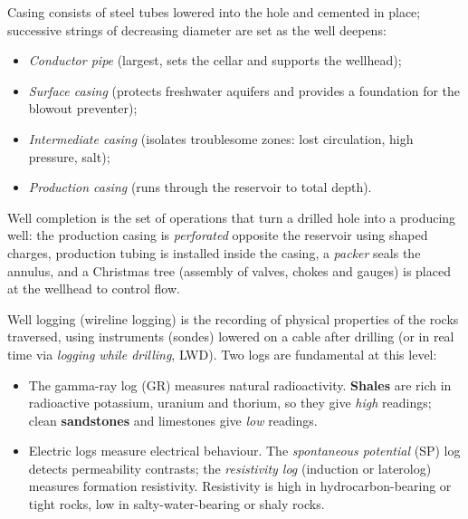 \documentclass[11pt]{article}
\newcommand{\cle}[1]{{\popxbold\color{popdark}#1}}
\begin{document}
\begin{definition}
\cle{Casing} consists of steel tubes lowered into the hole and cemented in place; successive strings of decreasing diameter are set as the well deepens:
\begin{itemize}
\item \emph{Conductor pipe} (largest, sets the cellar and supports the wellhead);
\item \emph{Surface casing} (protects freshwater aquifers and provides a foundation for the blowout preventer);
\item \emph{Intermediate casing} (isolates troublesome zones: lost circulation, high pressure, salt);
\item \emph{Production casing} (runs through the reservoir to total depth).
\end{itemize}
\cle{Well completion} is the set of operations that turn a drilled hole into a producing well: the production casing is \emph{perforated} opposite the reservoir using shaped charges, production tubing is installed inside the casing, a \emph{packer} seals the annulus, and a \cle{Christmas tree} (assembly of valves, chokes and gauges) is placed at the wellhead to control flow.
\end{definition}

\begin{definition}
\cle{Well logging} (wireline logging) is the recording of physical properties of the rocks traversed, using instruments (sondes) lowered on a cable after drilling (or in real time via \emph{logging while drilling}, LWD). Two logs are fundamental at this level:
\begin{itemize}
\item The \cle{gamma-ray log} (GR) measures natural radioactivity. \textbf{Shales} are rich in radioactive potassium, uranium and thorium, so they give \emph{high} readings; clean \textbf{sandstones} and limestones give \emph{low} readings.
\item \cle{Electric logs} measure electrical behaviour. The \emph{spontaneous potential} (SP) log detects permeability contrasts; the \emph{resistivity log} (induction or laterolog) measures formation resistivity. Resistivity is high in hydrocarbon-bearing or tight rocks, low in salty-water-bearing or shaly rocks.
\end{itemize}
\end{definition}
\end{document}
